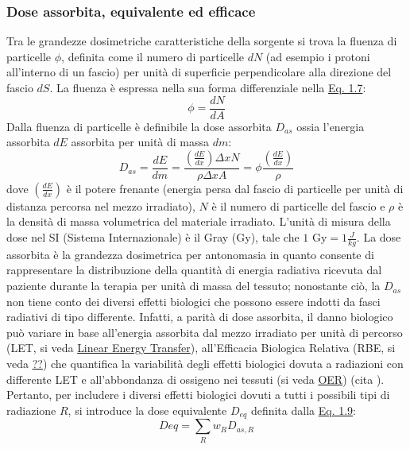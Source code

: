 \documentclass[12pt,a4paper,twoside]{report}
\begin{document}
	\subsubsection{Dose assorbita, equivalente ed efficace}
	Tra le grandezze dosimetriche caratteristiche della sorgente si trova la fluenza di particelle $\phi$, definita come il numero di particelle $dN$ (ad esempio i protoni all'interno di un fascio) per unità di superficie perpendicolare alla direzione del fascio $dS$. La fluenza è espressa nella sua forma differenziale nella \hyperref[eq:fluence]{Eq. 1.7}:
	\begin{equation}
		\phi=\frac{dN}{dA}
		\label{eq:fluence}
	\end{equation}
	Dalla fluenza di particelle è definibile la dose assorbita $D_{as}$ ossia l'energia assorbita $dE$ assorbita per unità di massa $dm$:
	\begin{equation}
		D_{as}=\frac{dE}{dm}=\frac{\left(\frac{dE}{dx}\right)\Delta x N}{\rho \Delta x A}=\phi\frac{\left(\frac{dE}{dx}\right)}{\rho}
		\label{eq:dose_as}
	\end{equation}
	dove $\left(\frac{dE}{dx}\right)$ è il potere frenante (energia persa dal fascio di particelle per unità di distanza percorsa nel mezzo irradiato), $N$ è il numero di particelle del fascio e $\rho$ è la densità di massa volumetrica del materiale irradiato. L'unità di misura della dose nel SI (Sistema Internazionale) è il Gray (Gy), tale che $1\mbox{ Gy}=1\frac{J}{kg}$. La dose assorbita è la grandezza dosimetrica per antonomasia in quanto consente di rappresentare la distribuzione della quantità di energia radiativa ricevuta dal paziente durante la terapia per unità di massa del tessuto; nonostante ciò, la $D_{as}$ non tiene conto dei diversi effetti biologici che possono essere indotti da fasci radiativi di tipo differente. Infatti, a parità di dose assorbita, il danno biologico può variare in base all'energia assorbita dal mezzo irradiato per unità di percorso (LET, si veda \hyperref[par:let]{Linear Energy Transfer}), all'Efficacia Biologica Relativa (RBE, si veda \hyperref[??]{??}) che quantifica la variabilità degli effetti biologici dovuta a radiazioni con differente LET e all'abbondanza di ossigeno nei tessuti (si veda \hyperref[par:oer]{OER}) (cita
	). Pertanto, per includere i diversi effetti biologici dovuti a tutti i possibili tipi di radiazione $R$, si introduce la dose equivalente $D_{eq}$ definita dalla \hyperref[eq:dose_eq]{Eq. 1.9}:
	\begin{equation}
		D{eq}=\sum_{R}w_RD_{as,R}
		\label{eq:dose_eq}
	\end{equation}
\end{document}
